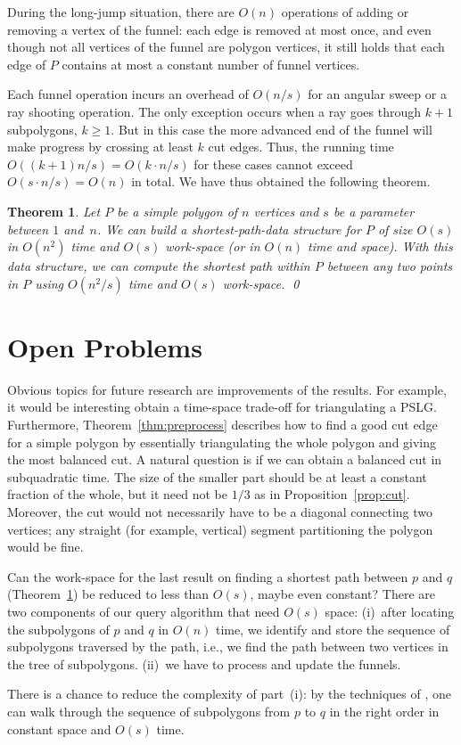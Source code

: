 \documentclass[11pt,a4paper]{article}
\newtheorem{theorem}{Theorem}[section]
\newcommand{\pslg}{PSLG}
\begin{document}
During the long-jump situation, there are $O(n)$ operations of
adding or removing a vertex of the funnel: each edge is removed at most once,
and even though not all vertices of the funnel are polygon vertices, it still holds
that each edge of $P$ contains at most a constant number of funnel vertices.

Each funnel operation incurs an overhead of  $O(n/s)$ for an
angular sweep or a ray shooting operation.
The only exception occurs when a ray goes through $k+1$ subpolygons,
$k\ge 1$. But in this case the more advanced end of the funnel will
make progress by crossing at least $k$ cut edges. Thus, the running
time $O((k+1) n/s)=O(k\cdot n/s)$ for these cases cannot exceed
$O(s\cdot n/s)=O(n)$ in total.
We have thus obtained the following theorem.

\begin{theorem}
\label{path-with-space}
  Let $P$ be a simple polygon of $n$ vertices and $s$ be a parameter
  between $1$ and~$n$. We can build a shortest-path-data structure for $P$
  of size $O(s)$ in $O(n^2)$ time and $O(s)$ work-space (or in $O(n)$ time and space).
  With this data structure, we can compute the shortest path
  within $P$ between any two points in $P$ using
  $O(n^2/s)$ time and $O(s)$ work-space.
\qed
\end{theorem}

\section{Open Problems}

Obvious topics for future research are improvements of
the results. For example, it would be interesting obtain a time-space trade-off
for triangulating a \pslg. Furthermore, Theorem~\ref{thm:preprocess} describes
how to find a good cut edge for a simple polygon by essentially triangulating
the whole polygon and giving the most balanced cut. A natural question is if we
can obtain a balanced cut in subquadratic time. The size of the smaller part should
be at least a constant fraction of the whole, but it need not be $1/3$ as in
Proposition~\ref{prop:cut}.  Moreover, the
cut would not necessarily have to be a diagonal connecting two
vertices; any straight (for example, vertical) segment partitioning
the polygon would be fine.

Can the work-space for the last result on finding a shortest path
between $p$ and $q$ (Theorem~\ref{path-with-space}) be reduced to less
than $O(s)$, maybe even constant?  There are two components of our
query algorithm that need $O(s)$ space:
(i)~after locating the subpolygons of $p$ and $q$ in $O(n)$ time, we
 identify and store the sequence of subpolygons traversed by
the path, i.e., we find the path between two vertices in the
tree of subpolygons.
(ii)~we have to process and update the funnels.

There is a chance to reduce the complexity of part~(i): by the
techniques of \cite[Theorem~2]{AsanoMuWa11}, one can walk through the
sequence of subpolygons from $p$ to $q$ in the right order in constant
space and $O(s)$ time.



\end{document}
